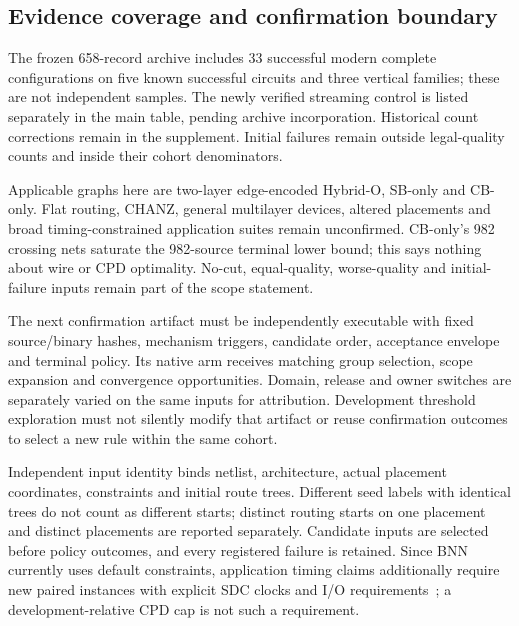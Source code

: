 \documentclass[conference,10pt]{IEEEtran}
\begin{document}
\subsection{Evidence coverage and confirmation boundary}
The frozen 658-record archive includes 33 successful modern complete configurations on five known successful circuits and three vertical families; these are not independent samples. The newly verified streaming control is listed separately in the main table, pending archive incorporation. Historical count corrections remain in the supplement. Initial failures remain outside legal-quality counts and inside their cohort denominators.

Applicable graphs here are two-layer edge-encoded Hybrid-O, SB-only and CB-only. Flat routing, CHANZ, general multilayer devices, altered placements and broad timing-constrained application suites remain unconfirmed. CB-only's 982 crossing nets saturate the 982-source terminal lower bound; this says nothing about wire or CPD optimality. No-cut, equal-quality, worse-quality and initial-failure inputs remain part of the scope statement.

The next confirmation artifact must be independently executable with fixed source/binary hashes, mechanism triggers, candidate order, acceptance envelope and terminal policy. Its native arm receives matching group selection, scope expansion and convergence opportunities. Domain, release and owner switches are separately varied on the same inputs for attribution. Development threshold exploration must not silently modify that artifact or reuse confirmation outcomes to select a new rule within the same cohort.

Independent input identity binds netlist, architecture, actual placement coordinates, constraints and initial route trees. Different seed labels with identical trees do not count as different starts; distinct routing starts on one placement and distinct placements are reported separately. Candidate inputs are selected before policy outcomes, and every registered failure is retained. Since BNN currently uses default constraints, application timing claims additionally require new paired instances with explicit SDC clocks and I/O requirements~\cite{vprsdc}; a development-relative CPD cap is not such a requirement.
\end{document}
